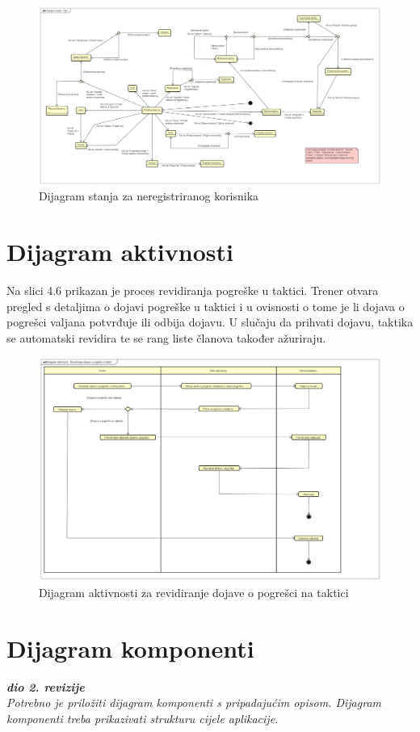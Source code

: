 			
			
			\begin{figure}[H]
				\centerfloat
				\includegraphics[scale=0.21]{dijagrami/DijagramstanjaClan.jpg} %
				\caption{Dijagram stanja za neregistriranog korisnika}
				\label{fig:UC9}
			\end{figure}
			
			\eject
			
			
		\section{Dijagram aktivnosti}
		
		Na slici 4.6 prikazan je proces revidiranja pogreške u taktici. Trener otvara pregled s detaljima o dojavi pogreške u taktici i u ovisnosti o tome je li dojava o pogrešci valjana potvrđuje ili odbija dojavu. U slučaju da prihvati dojavu, taktika se automatski revidira te se rang liste članova također ažuriraju.
			
				\begin{figure}[H]
				\centerfloat
				\includegraphics[scale=0.25]{dijagrami/Dijagramaktivnosti.jpg} %
				\caption{Dijagram aktivnosti za revidiranje dojave o pogrešci na taktici}
				\label{fig:UC9}
			\end{figure}
			
			\eject
		\section{Dijagram komponenti}
		
			\textbf{\textit{dio 2. revizije}}\\
		
			 \textit{Potrebno je priložiti dijagram komponenti s pripadajućim opisom. Dijagram komponenti treba prikazivati strukturu cijele aplikacije.}